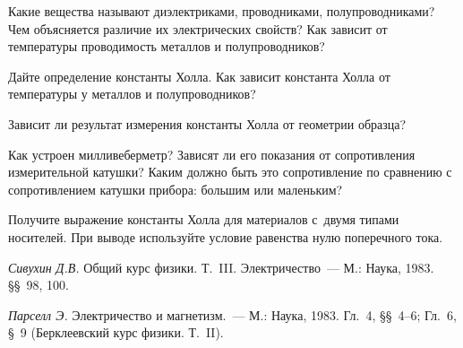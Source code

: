 \begin{lab:questions}

\item{ Какие вещества называют диэлектриками, проводниками, полупроводниками?
Чем объясняется различие их электрических свойств? Как зависит от температуры
проводимость металлов и полупроводников?}

\item{ Дайте определение константы Холла. Как зависит константа Холла от
температуры у металлов и полупроводников?}

\item{ Зависит ли результат измерения константы Холла от геометрии образца?}

\item{ Как устроен милливеберметр? Зависят ли его показания от сопротивления
измерительной катушки? Каким должно быть это сопротивление по сравнению с
сопротивлением катушки прибора: большим или маленьким?}

\item{ Получите выражение константы Холла для материалов с~двумя типами
носителей. При выводе используйте условие равенства нулю поперечного тока.}

\end{lab:questions}

\begin{lab:literature}

\item{ \emph{Сивухин Д.В.} Общий курс физики. Т.~III. Электричество~--- М.:
Наука, 1983. \S\S~98, 100.}

\item{ \emph{Парселл Э.} Электричество и магнетизм.~--- М.: Наука, 1983. Гл.~4,
\S\S~4--6; Гл.~6, \S~9 (Берклеевский курс физики. Т.~II).}

\end{lab:literature}
